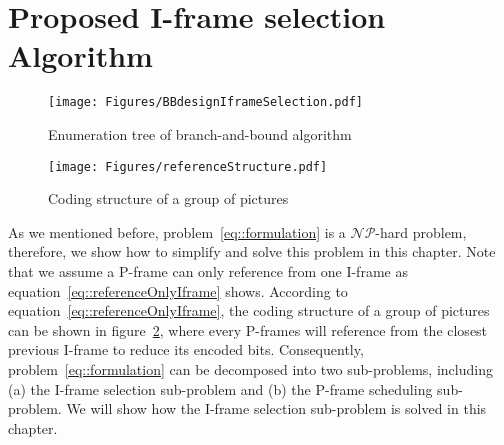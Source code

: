 \section{Proposed I-frame selection Algorithm}
\label{sec::IFrameSelection}
\begin{figure}
\begin{center}
\texttt{[image: Figures/BBdesignIframeSelection.pdf]}
\caption{\label{fig::BBdesgin}Enumeration tree of branch-and-bound algorithm}
\end{center}
\end{figure}
%
\begin{figure}
\begin{center}
\texttt{[image: Figures/referenceStructure.pdf]}
\caption{\label{fig::encodeOrder}Coding structure of a group of pictures}
\end{center}
\end{figure}
As we mentioned before, problem~\eqref{eq::formulation} is a $\mathcal{NP}$-hard problem, therefore, we show how to simplify and solve this problem in this chapter.
Note that we assume a P-frame can only reference from one I-frame as equation~\eqref{eq::referenceOnlyIframe} shows.
According to equation~\eqref{eq::referenceOnlyIframe}, the coding structure of a group of pictures can be shown in figure~\ref{fig::encodeOrder}, where every P-frames will reference from the closest previous I-frame to reduce its encoded bits.
Consequently, problem~\eqref{eq::formulation} can be decomposed into two sub-problems, including (a) the I-frame selection sub-problem and (b) the P-frame scheduling sub-problem.
We will show how the I-frame selection sub-problem is solved in this chapter.

